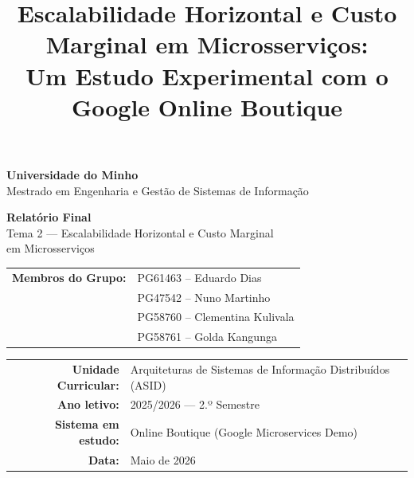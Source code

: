 \documentclass[manuscript,screen,review]{acmart}
\title{Escalabilidade Horizontal e Custo Marginal em Microsserviços:\\
Um Estudo Experimental com o Google Online Boutique}
\begin{document}
\begin{titlepage}
\thispagestyle{empty}
\begin{center}
\vspace*{1.5cm}

{\large \textbf{Universidade do Minho}}\\[0.3cm]
{\normalsize Mestrado em Engenharia e Gestão de Sistemas de Informação}

\vspace{2.5cm}

{\LARGE \textbf{Relatório Final}}\\[0.6cm]
{\large Tema 2 — Escalabilidade Horizontal e Custo Marginal\\[0.2cm]
em Microsserviços}

\vspace{2.5cm}

\begin{tabular}{rl}
\textbf{Membros do Grupo:} & PG61463 – Eduardo Dias \\[0.2cm]
 & PG47542 – Nuno Martinho \\[0.2cm]
 & PG58760 – Clementina Kulivala \\[0.2cm]
 & PG58761 – Golda Kangunga \\
\end{tabular}

\vspace{2cm}

\begin{tabular}{rl}
\textbf{Unidade Curricular:} & Arquiteturas de Sistemas de Informação Distribuídos (ASID) \\[0.2cm]
\textbf{Ano letivo:} & 2025/2026 — 2.º Semestre \\[0.2cm]
\textbf{Sistema em estudo:} & Online Boutique (Google Microservices Demo) \\[0.2cm]
\textbf{Data:} & Maio de 2026 \\
\end{tabular}

\end{center}
\end{titlepage}

\maketitle
\end{document}
